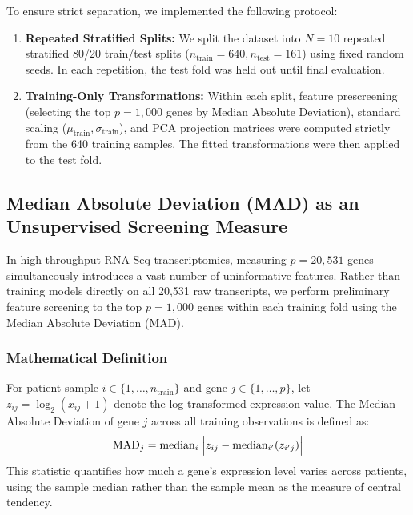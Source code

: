 \documentclass[11pt,a4paper]{article}
\begin{document}
To ensure strict separation, we implemented the following protocol:
\begin{enumerate}
    \item \textbf{Repeated Stratified Splits:} We split the dataset into $N = 10$ repeated stratified 80/20 train/test splits ($n_{\text{train}} = 640, n_{\text{test}} = 161$) using fixed random seeds. In each repetition, the test fold was held out until final evaluation.
    \item \textbf{Training-Only Transformations:} Within each split, feature prescreening (selecting the top $p = 1{,}000$ genes by Median Absolute Deviation), standard scaling ($\mu_{\text{train}}, \sigma_{\text{train}}$), and PCA projection matrices were computed strictly from the 640 training samples. The fitted transformations were then applied to the test fold.
\end{enumerate}

\subsection{Median Absolute Deviation (MAD) as an Unsupervised Screening Measure}
In high-throughput RNA-Seq transcriptomics, measuring $p = 20{,}531$ genes simultaneously introduces a vast number of uninformative features. Rather than training models directly on all 20,531 raw transcripts, we perform preliminary feature screening to the top $p = 1{,}000$ genes within each training fold using the Median Absolute Deviation (MAD).

\subsubsection{Mathematical Definition}
For patient sample $i \in \{1, \dots, n_{\text{train}}\}$ and gene $j \in \{1, \dots, p\}$, let $z_{ij} = \log_2(x_{ij} + 1)$ denote the log-transformed expression value. The Median Absolute Deviation of gene $j$ across all training observations is defined as:
\begin{equation}
    \text{MAD}_j = \text{median}_i \;\Bigl| z_{ij} - \text{median}_{i'}(z_{i'j}) \Bigr|
    \label{eq:mad}
\end{equation}
This statistic quantifies how much a gene's expression level varies across patients, using the sample median rather than the sample mean as the measure of central tendency.
\end{document}
